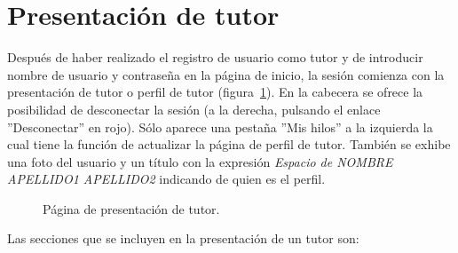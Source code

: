 \documentclass[a4paper, 12pt]{book}
\begin{document}
\section{Presentaci\'on de tutor}
\label{app:presentaciontutor}
Despu\'es de haber realizado el registro de usuario como tutor y de introducir nombre de usuario y contrase\~na en la p\'agina de inicio, la sesi\'on 
comienza con la presentaci\'on de tutor o perfil de tutor (figura~\ref{figura:tutor}). En la cabecera se ofrece la posibilidad de desconectar la sesi\'on (a la derecha, pulsando el 
enlace ''Desconectar'' en rojo). S\'olo aparece una pesta\~na ''Mis hilos'' a la izquierda la cual tiene la funci\'on de actualizar la p\'agina de perfil 
de tutor. Tambi\'en se exhibe una foto del usuario y un t\'itulo con la expresi\'on \textit{Espacio de NOMBRE APELLIDO1 APELLIDO2} indicando de quien es el
perfil.

\begin{figure}[htbp] 
  \centering
  \caption{P\'agina de presentaci\'on de tutor.}
  \label{figura:tutor}
\end{figure}

Las secciones que se incluyen en la presentaci\'on de un tutor son:
\end{document}
